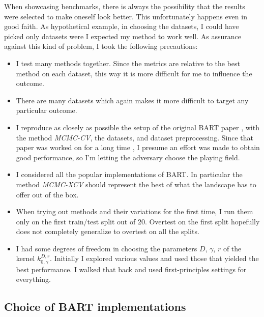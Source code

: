 \documentclass[a4paper]{article}
\theoremstyle{definition}
\begin{document}
    When showcasing benchmarks, there is always the possibility that the results were selected to make oneself look better. This unfortunately happens even in good faith. As hypothetical example, in choosing the datasets, I could have picked only datasets were I expected my method to work well. As assurance against this kind of problem, I took the following precautions:
    \begin{itemize}
        
        \item I test many methods together. Since the metrics are relative to the best method on each dataset, this way it is more difficult for me to influence the outcome.

        \item There are many datasets which again makes it more difficult to target any particular outcome.

        \item I reproduce as closely as possible the setup of the original BART paper \autocite{chipman2010}, with the method \emph{MCMC-CV}, the datasets, and dataset preprocessing. Since that paper was worked on for a long time \autocite[at least since][]{chipman2006}, I presume an effort was made to obtain good performance, so I'm letting the adversary choose the playing field.

        \item I considered all the popular implementations of BART. In particular the method \emph{MCMC-XCV} should represent the best of what the landscape has to offer out of the box.

        \item When trying out methods and their variations for the first time, I run them only on the first train/test split out of 20. Overtest on the first split hopefully does not completely generalize to overtest on all the splits.

        \item I had some degrees of freedom in choosing the parameters $D$, $\gamma$, $r$ of the kernel $k^{D,r}_{0,\gamma}$. Initially I explored various values and used those that yielded the best performance. I walked that back and used first-principles settings for everything.

    \end{itemize}

    \subsection{Choice of BART implementations}
    \label{sec:crancomparison}
    
\end{document}

